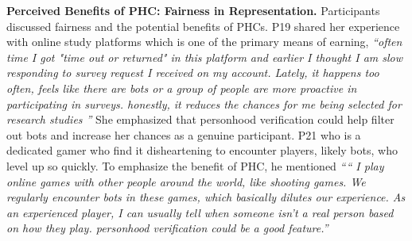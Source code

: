 \fi


\textbf{Perceived Benefits of PHC: Fairness in Representation.} Participants discussed fairness and the potential benefits of PHCs. P19 shared her experience with online study platforms which is one of the primary means of earning, \textit{``often time I got "time out or returned" in this platform and earlier I thought I am slow responding to survey request I received on my account. Lately, it happens too often, feels like there are bots or a group of people are more proactive in participating in surveys. honestly, it reduces the chances for me being selected for research studies ''} She emphasized that personhood verification could help filter out bots and increase her chances as a genuine participant.  P21 who is a dedicated gamer who find it disheartening to encounter players, likely bots, who level up so quickly. To emphasize the benefit of PHC, he mentioned \textit{``“ I play online games with other people around the world, like shooting games. We regularly encounter bots in these games, which basically dilutes our experience. As an experienced player, I can usually tell when someone isn’t a real person
based on how they play. personhood verification could be a good feature.''}







